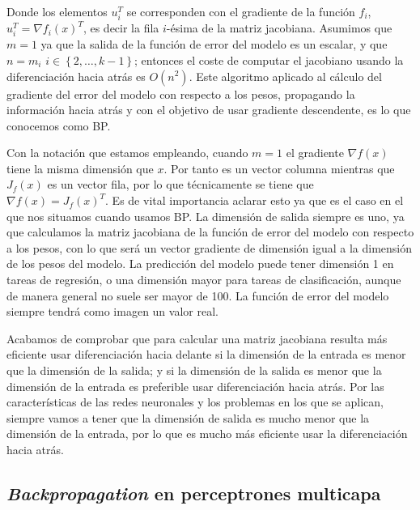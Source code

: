 Donde los elementos $u_i^T$ se corresponden con el gradiente de la función $f_i$, $u_i^T=\nabla f_i(x)^T$, es decir la fila $i$-ésima de la matriz jacobiana. Asumimos que $m=1$ ya que la salida de la función de error del modelo es un escalar, y que $n=m_i$ $i \in \left \{2,\ldots, k-1 \right \}$; entonces el coste de computar el jacobiano usando la diferenciación hacia atrás es $O(n^2)$. Este algoritmo aplicado al cálculo del gradiente del error del modelo con respecto a los pesos, propagando la información hacia atrás y con el objetivo de usar gradiente descendente, es lo que conocemos como BP. 

Con la notación que estamos empleando, cuando $m=1$ el gradiente $\nabla f(x)$ tiene la misma dimensión que $x$. Por tanto es un vector columna mientras que $J_f(x)$ es un vector fila, por lo que técnicamente se tiene que $\nabla f(x)= J_f(x)^T$. Es de vital importancia aclarar esto ya que es el caso en el que nos situamos cuando usamos BP. La dimensión de salida siempre es uno, ya que calculamos la matriz jacobiana de la función de error del modelo con respecto a los pesos, con lo que será un vector gradiente de dimensión igual a la dimensión de los pesos del modelo. La predicción del modelo puede tener dimensión 1 en tareas de regresión, o una dimensión mayor para tareas de clasificación, aunque de manera general no suele ser mayor de 100. La función de error del modelo siempre tendrá como imagen un valor real.


Acabamos de comprobar que para calcular una matriz jacobiana resulta más eficiente usar diferenciación hacia delante si la dimensión de la entrada es menor que la dimensión de la salida; y si la dimensión de la salida es menor que la dimensión de la entrada es preferible usar diferenciación hacia atrás. Por las características de las redes neuronales y los problemas en los que se aplican, siempre vamos a tener que la dimensión de salida es mucho menor que la dimensión de la entrada, por lo que es mucho más eficiente usar la diferenciación hacia atrás. 




\subsection{\textit{Backpropagation} en perceptrones multicapa}


